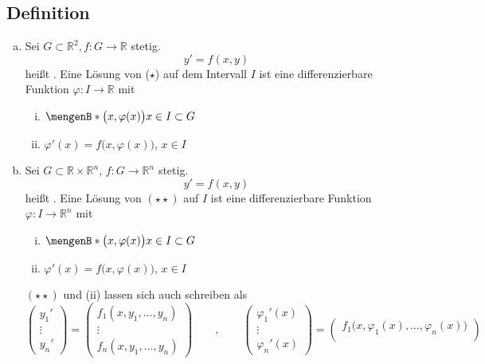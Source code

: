 \subsection[Definition: Gewöhnliche Differentialgleichungen]{Definition} %
\label{sub:11}
\begin{enumerate}[a)]
	\item Sei $G \subset \mathds{R}^2, f \colon G \to \mathds{R}$ stetig. 
	\[
		y' = f(x,y) \tag{$\star$}
	\] 
	heißt .  Eine Lösung von ($\star$) auf dem Intervall $I$ ist eine differenzierbare Funktion 
	$\varphi \colon I \to \mathds{R}$ mit
	\begin{enumerate}[(i)]
		\item $\set[\big(x, \varphi(x)\big)]{x \in I} \subset G $
		\item $\varphi ' (x) = f\big(x, \varphi(x)\big)$, $x  \in I$
	\end{enumerate}
	\item Sei $G \subset \mathds{R} \times \mathds{R}^n$, $f : G \to \mathds{R}^n$ stetig.
	\[
		y' = f(x,y) \tag{$\star \star$}
	\]
	heißt . Eine Lösung von $(\star \star)$ auf $I$ ist eine differenzierbare Funktion 
	$\varphi : I \to \mathds{R}^n$ mit
	\begin{enumerate}[(i)]
		\item $\set[\big(x, \varphi(x)\big)]{x \in I} \subset G$
		\item $\varphi'(x) = f \big(x,\varphi(x)\big)$, $x \in I$
	\end{enumerate}
	$(\star \star)$ und (ii) lassen sich auch schreiben als 
	\[
		\begin{pmatrix}
			y_1' \\ \vdots \\ y_n'
		\end{pmatrix} = \begin{pmatrix}
			f_1(x, y_1, \ldots , y_n) \\
			\vdots \\
			f_n(x, y_1, \ldots , y_n)
		\end{pmatrix} \qquad , \qquad \begin{pmatrix}
			\varphi_1'(x) \\
			\vdots \\
			\varphi_n'(x)
		\end{pmatrix} = \begin{pmatrix}
			f_1\big(x, \varphi_1(x), \ldots , \varphi_n(x)\big) \\

\end{pmatrix}\]
\end{enumerate}
